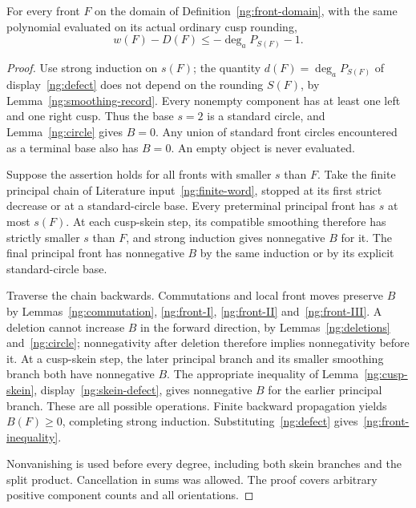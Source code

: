 \begin{theorem}
\label{ng:local-front-bound}
For every front $F$ on the domain of Definition~\ref{ng:front-domain},
with the same polynomial evaluated on its actual ordinary cusp rounding,
\begin{equation}\label{ng:front-inequality}
 w(F)-D(F)\leq-\deg_a P_{S(F)}-1.
\end{equation}
\end{theorem}
\begin{proof}
Use strong induction on $s(F)$; the quantity $d(F)=\deg_aP_{S(F)}$ of
display~\eqref{ng:defect} does not depend on the rounding $S(F)$, by
Lemma~\ref{ng:smoothing-record}. Every nonempty component has at least
one left and one right cusp. Thus the base $s=2$ is a standard circle,
and Lemma~\ref{ng:circle} gives $B=0$. Any union of standard front
circles encountered as a terminal base also has $B=0$. An empty object
is never evaluated.

Suppose the assertion holds for all fronts with smaller $s$ than $F$.
Take the finite principal chain of Literature input~\ref{ng:finite-word},
stopped at its first strict decrease or at a standard-circle base.
Every preterminal principal front has $s$ at most $s(F)$. At each
cusp-skein step, its compatible smoothing therefore has strictly smaller
$s$ than $F$, and strong induction gives nonnegative $B$ for it. The
final principal front has nonnegative $B$ by the same induction or by
its explicit standard-circle base.

Traverse the chain backwards. Commutations and local front moves
preserve $B$ by Lemmas~\ref{ng:commutation}, \ref{ng:front-I}, \ref{ng:front-II}
and~\ref{ng:front-III}.
A deletion cannot increase $B$ in the forward direction, by
Lemmas~\ref{ng:deletions} and~\ref{ng:circle}; nonnegativity after
deletion therefore implies nonnegativity before it. At a cusp-skein
step, the later principal branch and its smaller smoothing branch both
have nonnegative $B$. The appropriate inequality
of Lemma~\ref{ng:cusp-skein}, display~\eqref{ng:skein-defect}, gives nonnegative $B$ for the earlier
principal branch. These are all possible operations. Finite backward
propagation yields $B(F)\geq0$, completing strong induction.
Substituting~\eqref{ng:defect} gives~\eqref{ng:front-inequality}.

Nonvanishing is used before every degree, including both skein branches
and the split product. Cancellation in sums was allowed. The proof
covers arbitrary positive component counts and all orientations.
\end{proof}

